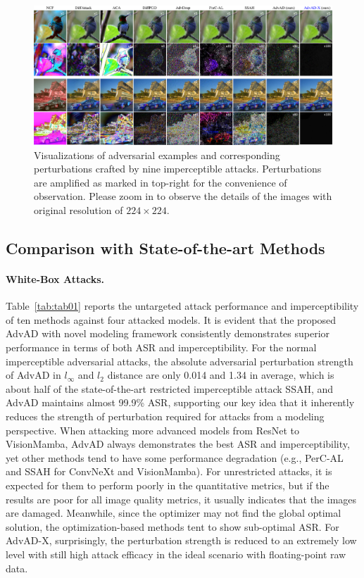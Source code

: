 \documentclass{article}
\begin{document}
\begin{figure}[t]
\centering
\includegraphics[width=0.9\columnwidth]{figures/main_vis.pdf}
\caption{Visualizations of adversarial examples and corresponding perturbations crafted by nine imperceptible attacks.
Perturbations are amplified as marked in top-right for the convenience of observation. Please zoom in to observe the details of the images with original resolution of $224\times224$.}
\label{fig:2}
\vspace{-0.2599cm}
\end{figure}






\subsection{Comparison with State-of-the-art Methods}
\paragraph{White-Box Attacks.} 
Table~\ref{tab:tab01} reports the untargeted attack performance and imperceptibility of ten methods against four attacked models. It is evident that the proposed AdvAD with novel modeling framework consistently demonstrates superior performance in terms of both ASR and imperceptibility. For the normal imperceptible adversarial attacks, the absolute adversarial perturbation strength of AdvAD in $l_\infty$ and $l_2$ distance are only {0.014} and {1.34} in average, which is about half of the state-of-the-art restricted imperceptible attack SSAH, and AdvAD maintains almost {99.9\%} ASR, supporting our key idea that it inherently reduces the strength of perturbation required for attacks from a modeling perspective. When attacking more advanced models from ResNet to VisionMamba, AdvAD always demonstrates the best ASR and imperceptibility, yet other methods tend to have some performance degradation (e.g., PerC-AL and SSAH for ConvNeXt and VisionMamba). For unrestricted attacks, it is expected for them to perform poorly in the quantitative metrics, but if the results are poor for all image quality metrics, it usually indicates that the images are damaged. Meanwhile, since the optimizer may not find the global optimal solution, the optimization-based methods tent to show sub-optimal ASR.
For AdvAD-X, surprisingly, the perturbation strength is reduced to an extremely low level with still high attack efficacy in the ideal scenario with floating-point raw data.
\end{document}
